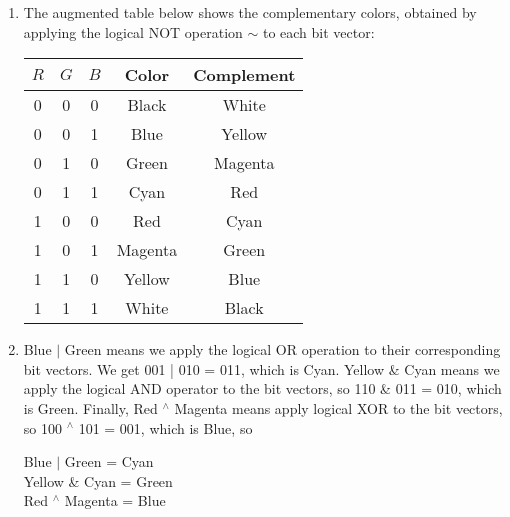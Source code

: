 \documentclass[12pt]{article}
\newenvironment{sol}[1][Solution]{\begin{trivlist}
		\item[\hskip \labelsep {\bfseries #1:}]}{\end{trivlist}}
\begin{document}
\begin{sol}
	\begin{enumerate}[label=(\alph*)]
		\item The augmented table below shows the complementary colors, obtained by applying
		the logical NOT operation $\sim$ to each bit vector:
		\begin{center}
			\begin{tabular}{ccccc}
				$R$ & $G$ & $B$ & Color & Complement\\
				\hline
				0 & 0 & 0 & Black & White\\
				0 & 0 & 1 & Blue & Yellow \\
				0 & 1 & 0 & Green & Magenta\\
				0 & 1 & 1 & Cyan  & Red  \\
				1 & 0 & 0 & Red & Cyan \\
				1 & 0 & 1 & Magenta & Green\\
				1 & 1 & 0 & Yellow & Blue\\
				1 & 1 & 1 & White & Black
			\end{tabular}
		\end{center}
		\item Blue $|$ Green means we apply the logical OR operation to their corresponding bit
		vectors. We get 001 | 010 = 011, which is Cyan. Yellow \& Cyan means we apply the logical
		AND operator to the bit vectors, so 110 \& 011 = 010, which is Green. Finally,
		Red $^\wedge$ Magenta means apply logical XOR to the bit vectors, so 100 $^\wedge$ 101 = 001,
		which is Blue, so
		\begin{center}
			Blue $|$ Green = Cyan \\
			Yellow \& Cyan = Green \\
			Red $^\wedge$ Magenta = Blue
		\end{center}
	\end{enumerate}
\end{sol}
\end{document}
